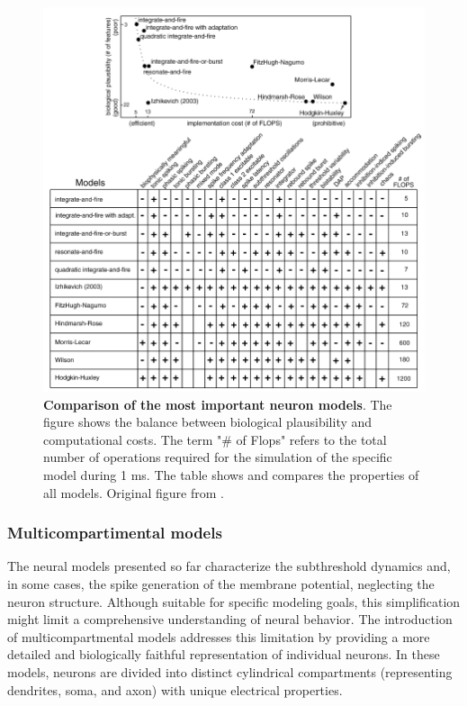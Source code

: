 \documentclass[../main.tex]{subfiles}
\begin{document}
\begin{figure}[!htb]
    \begin{center}
    \includegraphics[width=\textwidth]{chapter1/figures/Izhikevich_model_comparison.png}
    \caption{\textbf{Comparison of the most important neuron models}.
    The figure shows the balance between biological plausibility and computational costs.
    The term  "\# of Flops" refers to the total number of operations required for the simulation of the specific model during 1 ms.
    The table shows and compares the properties of all models.
    Original figure from \citep{izhikevich_dynamical_2007}.}
    \label{fig:neuron-model-comparison}
    \end{center}
\end{figure}
\subsubsection{Multicompartimental models}
The neural models presented so far characterize the subthreshold dynamics and, in some cases, the spike generation of the membrane potential, neglecting the neuron structure.
Although suitable for specific modeling goals, this simplification might limit a comprehensive understanding of neural behavior.
The introduction of multicompartmental models addresses this limitation by providing a more detailed and biologically faithful representation of individual neurons.
In these models, neurons are divided into distinct cylindrical compartments (representing dendrites, soma, and axon) with unique electrical properties.
\end{document}
